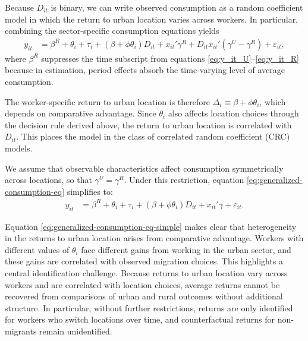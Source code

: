 Because $D_{it}$ is binary, we can write observed consumption as a random coefficient model in which the return to urban location varies across workers.
In particular, combining the sector-specific consumption equations yields
\begin{align}
    y_{it}&=\beta^R+\theta_i + \tau_i +(\beta+\phi \theta_i)D_{it}+  x_{it}'\gamma^R + D_{it}x_{it}'(\gamma^U-\gamma^R) + \varepsilon_{it},\label{eq:generalized-consumption-eq}
\end{align}
\noindent where $\beta^R$ suppresses the time subscript from equations \eqref{eq:y_it_U}--\eqref{eq:y_it_R} because in estimation, period effects absorb the time-varying level of average consumption.

The worker-specific return to urban location is therefore $\Delta_i \equiv \beta + \phi\theta_{i}$, which depends on comparative advantage.
Since $\theta_{i}$ also affects location choices through the decision rule derived above, the return to urban location is correlated with $D_{it}$.
This places the model in the class of correlated random coefficient (CRC) models.



We assume that observable characteristics affect consumption symmetrically across locations, so that $\gamma^U=\gamma^R$.
Under this restriction, equation \eqref{eq:generalized-consumption-eq} simplifies to: 
\begin{align}
    y_{it}&=\beta^R+\theta_i + \tau_i +(\beta+\phi \theta_i)D_{it}+  x_{it}'\gamma + \varepsilon_{it}.\tag{10$'$}\label{eq:generalized-consumption-eq-simple}
\end{align}

Equation \eqref{eq:generalized-consumption-eq-simple} makes clear that heterogeneity in the returns to urban location arises from comparative advantage. 
Workers with different values of $\theta_{i}$ face different gains from working in the urban sector, and these gains are correlated with observed migration choices. 
This highlights a central identification challenge.
Because returns to urban location vary across workers and are correlated with location choices, average returns cannot be recovered from comparisons of urban and rural outcomes without additional structure.
In particular, without further restrictions, returns are only identified for workers who switch locations over time, and counterfactual returns for non-migrants remain unidentified.

